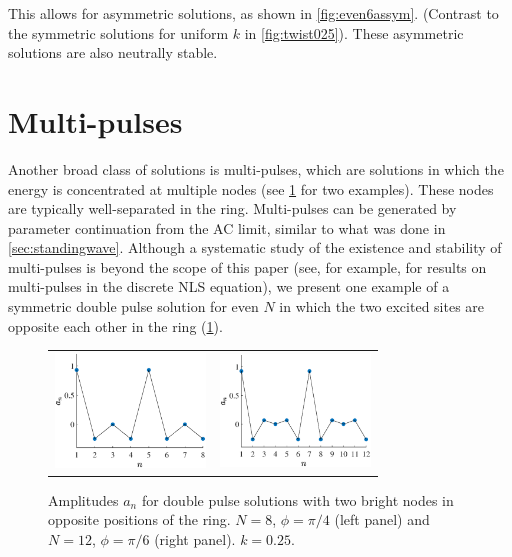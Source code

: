 \documentclass[reprint, amsmath,amssymb,aps]{revtex4-2}
\def\noi{\noindent}
\begin{document}
\noi This allows for asymmetric solutions, as shown in \cref{fig:even6assym}. (Contrast to the symmetric solutions for uniform $k$ in \cref{fig:twist025}). These asymmetric solutions are also neutrally stable.

\section{Multi-pulses}

Another broad class of solutions is multi-pulses, which are solutions in which the energy is concentrated at multiple nodes (see \cref{fig:dp} for two examples). These nodes are typically well-separated in the ring. Multi-pulses can be generated by parameter continuation from the AC limit, similar to what was done in \cref{sec:standingwave}. Although a systematic study of the existence and stability of multi-pulses is beyond the scope of this paper (see, for example, \cite{Parker2020} for results on multi-pulses in the discrete NLS equation), we present one example of a symmetric double pulse solution for even $N$ in which the two excited sites are opposite each other in the ring (\cref{fig:dp}). 

\begin{figure}
\begin{center}
\begin{tabular}{cc}
\includegraphics[width=4cm]{images/dp8pi4} &
\includegraphics[width=4cm]{images/dp12pi6}
\end{tabular}
\end{center}
\caption{Amplitudes $a_n$ for double pulse solutions with two bright nodes in opposite positions of the ring. $N=8$, $\phi=\pi/4$ (left panel) and $N=12$, $\phi=\pi/6$ (right panel). $k=0.25$.}
\label{fig:dp}
\end{figure}
\end{document}
